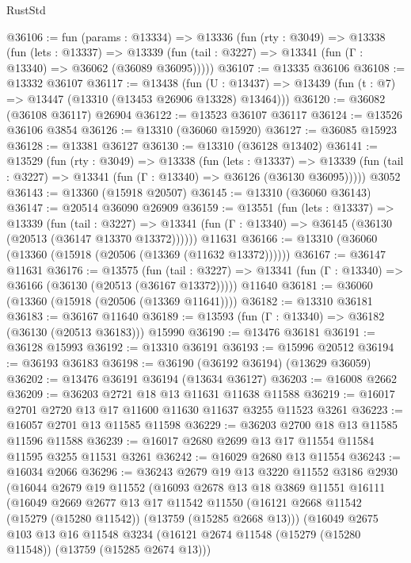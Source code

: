 \begin{lexlean}{RustStd}
\begin{coremodule}
@36106 := fun (params : @13334) =>
  @13336
    (fun (rty : @3049) =>
    @13338
      (fun (lets : @13337) =>
      @13339 (fun (tail : @3227) => @13341 (fun (Γ : @13340) => @36062 (@36089 @36095)))))
@36107 := @13335 @36106
@36108 := @13332 @36107
@36117 := @13438
    (fun (U : @13437) => @13439 (fun (t : @7) => @13447 (@13310 (@13453 @26906 @13328) @13464)))
@36120 := @36082 (@36108 @36117) @26904
@36122 := @13523 @36107 @36117
@36124 := @13526 @36106 @3854
@36126 := @13310 (@36060 @15920)
@36127 := @36085 @15923
@36128 := @13381 @36127
@36130 := @13310 (@36128 @13402)
@36141 := @13529
    (fun (rty : @3049) =>
    @13338
      (fun (lets : @13337) =>
      @13339 (fun (tail : @3227) => @13341 (fun (Γ : @13340) => @36126 (@36130 @36095)))))
    @3052
@36143 := @13360 (@15918 @20507)
@36145 := @13310 (@36060 @36143)
@36147 := @20514 @36090 @26909
@36159 := @13551
    (fun (lets : @13337) =>
    @13339
      (fun (tail : @3227) =>
      @13341 (fun (Γ : @13340) => @36145 (@36130 (@20513 (@36147 @13370 @13372))))))
    @11631
@36166 := @13310 (@36060 (@13360 (@15918 (@20506 (@13369 (@11632 @13372))))))
@36167 := @36147 @11631
@36176 := @13575
    (fun (tail : @3227) => @13341 (fun (Γ : @13340) => @36166 (@36130 (@20513 (@36167 @13372)))))
    @11640
@36181 := @36060 (@13360 (@15918 (@20506 (@13369 @11641))))
@36182 := @13310 @36181
@36183 := @36167 @11640
@36189 := @13593 (fun (Γ : @13340) => @36182 (@36130 (@20513 @36183))) @15990
@36190 := @13476 @36181
@36191 := @36128 @15993
@36192 := @13310 @36191
@36193 := @15996 @20512
@36194 := @36193 @36183
@36198 := @36190 (@36192 @36194) (@13629 @36059)
@36202 := @13476 @36191 @36194 (@13634 @36127)
@36203 := @16008 @2662
@36209 := @36203 @2721 @18 @13 @11631 @11638 @11588
@36219 := @16017 @2701 @2720 @13 @17 @11600 @11630 @11637 @3255 @11523 @3261
@36223 := @16057 @2701 @13 @11585 @11598
@36229 := @36203 @2700 @18 @13 @11585 @11596 @11588
@36239 := @16017 @2680 @2699 @13 @17 @11554 @11584 @11595 @3255 @11531 @3261
@36242 := @16029 @2680 @13 @11554
@36243 := @16034 @2066
@36296 := @36243
    @2679
    @19
    @13
    @3220
    @11552
    @3186
    @2930
    (@16044
      @2679
      @19
      @11552
      (@16093
        @2678
        @13
        @18
        @3869
        @11551
        @16111
        (@16049
          @2669
          @2677
          @13
          @17
          @11542
          @11550
          (@16121 @2668 @11542 (@15279 (@15280 @11542)) (@13759 (@15285 @2668 @13)))
          (@16049
            @2675
            @103
            @13
            @16
            @11548
            @3234
            (@16121 @2674 @11548 (@15279 (@15280 @11548)) (@13759 (@15285 @2674 @13)))

\end{coremodule}
\end{lexlean}
